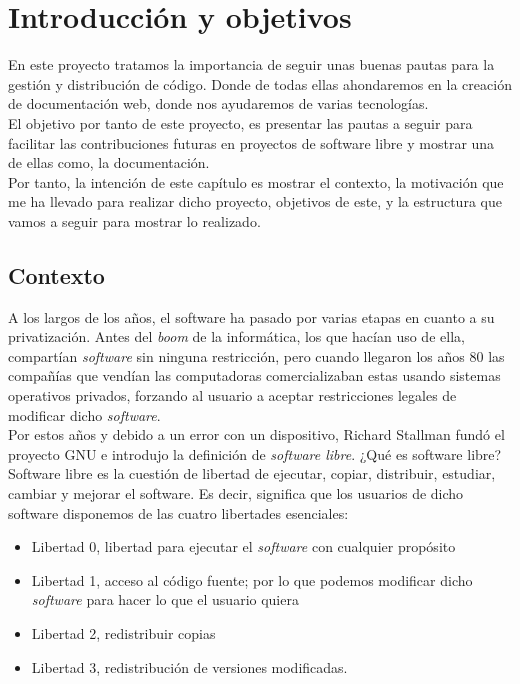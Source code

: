 \documentclass[a4paper, 12pt]{book}
\begin{document}
\tableofcontents


\chapter{Introducción y objetivos}
\label{chap:intro}
En este proyecto tratamos la importancia de seguir unas buenas pautas para la gestión y distribución de código. Donde de todas ellas ahondaremos en la creación de documentación web, donde nos ayudaremos de varias tecnologías. \\
El objetivo por tanto de este proyecto, es presentar las pautas a seguir para facilitar las contribuciones futuras en proyectos de software libre y mostrar una de ellas como, la documentación. \\
Por tanto, la intención de este capítulo es mostrar el contexto, la motivación que  me ha llevado para realizar dicho proyecto, objetivos de este, y la estructura que vamos a seguir para mostrar lo realizado.

\section{Contexto}
\label{sec:contex}
A los largos de los años, el software ha pasado por varias etapas en cuanto a su privatización. Antes del \emph{boom} de la informática, los que hacían uso de ella, compartían \emph{software} sin ninguna restricción, pero cuando llegaron los años 80 las compañías que vendían las computadoras comercializaban estas usando sistemas operativos privados, forzando al usuario a aceptar restricciones legales de modificar dicho \emph{software}.\\ 
Por estos años y debido a un error con un dispositivo, Richard Stallman fundó el proyecto GNU e introdujo la definición de \emph{software libre}. ¿Qué es software libre? Software libre es la cuestión de libertad de ejecutar, copiar, distribuir, estudiar, cambiar y mejorar el software.
\newpage
Es decir, significa que los usuarios de dicho software disponemos de las cuatro libertades esenciales: 
\begin{itemize}
    \item Libertad 0, libertad para ejecutar el \emph{software} con cualquier propósito
    \item Libertad 1, acceso al código fuente; por lo que podemos modificar dicho \emph{software} para hacer lo que el usuario quiera
    \item Libertad 2, redistribuir copias 
    \item Libertad 3, redistribución de versiones modificadas.
\end{itemize}
\end{document}

